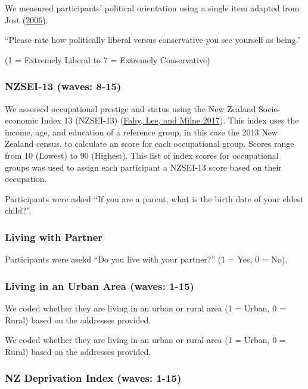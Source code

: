 \documentclass[
  singlecolumn]{report}
\begin{document}
We measured participants' political orientation using a single item
adapted from Jost (\protect\hyperlink{ref-jost_end_2006-1}{2006}).

``Please rate how politically liberal versus conservative you see
yourself as being.''

(1 = Extremely Liberal to 7 = Extremely Conservative)

\hypertarget{nzsei-13-waves-8-15}{%
\subsubsection{NZSEI-13 (waves: 8-15)}\label{nzsei-13-waves-8-15}}

We assessed occupational prestige and status using the New Zealand
Socio-economic Index 13 (NZSEI-13)
(\protect\hyperlink{ref-fahy2017}{Fahy, Lee, and Milne 2017}). This
index uses the income, age, and education of a reference group, in this
case the 2013 New Zealand census, to calculate an score for each
occupational group. Scores range from 10 (Lowest) to 90 (Highest). This
list of index scores for occupational groups was used to assign each
participant a NZSEI-13 score based on their occupation.

Participants were asked ``If you are a parent, what is the birth date of
your eldest child?''.

\hypertarget{living-with-partner}{%
\subsubsection{Living with Partner}\label{living-with-partner}}

Participants were asekd ``Do you live with your partner?'' (1 = Yes, 0 =
No).

\hypertarget{living-in-an-urban-area-waves-1-15}{%
\subsubsection{Living in an Urban Area (waves:
1-15)}\label{living-in-an-urban-area-waves-1-15}}

We coded whether they are living in an urban or rural area (1 = Urban, 0
= Rural) based on the addresses provided.

We coded whether they are living in an urban or rural area (1 = Urban, 0
= Rural) based on the addresses provided.

\hypertarget{nz-deprivation-index-waves-1-15}{%
\subsubsection{NZ Deprivation Index (waves:
1-15)}\label{nz-deprivation-index-waves-1-15}}
\end{document}

